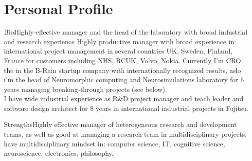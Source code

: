 \documentclass{moderncv}
\begin{document}
%
\makecvtitle

 
\section{Personal Profile}

\cventry
    {Bio}{Highly-effective manager and the head of the laboratory with broad industrial and research experience}{}{}{}
    {Highly productive manager with broad experience in: international project management in several countries UK, Sweden, Finland, France for customers including NHS, RCUK, Volvo, Nokia.
      Currently I'm CRO the in the B-Rain startup company with internationally recognized results, aslo i'm the head of  Neuromorphic computing and Neurosimulations laboratory for 6 years managing breaking-through projects (see below).\\
      I have wide industrial experience as R\&D project manager and teach leader and software design architect for 8 years in international industrial projects in Fujitsu.}

\cvitem
    {Strengths}{\small Highly effective manager of heterogeneous research and development teams, as well as good at managing a research team in multidisciplinary projects, have multidisciplinary mindset in: computer science, IT, cognitive science, neuroscience, electronics, philosophy.}
\end{document}
